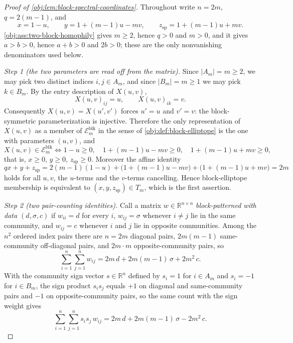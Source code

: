 \documentclass[11pt]{article}
\begin{document}
\begin{proof}[Proof of \cref{obj:lem:block-spectral-coordinates}]
Throughout write \(n=2m\), \(q=2(m-1)\), and
\[
x=1-u,\qquad
y=1+(m-1)u-mv,\qquad
z_{\mathrm{sp}}=1+(m-1)u+mv .
\]
\cref{obj:ass:two-block-homophily} gives \(m\ge2\), hence \(q>0\) and \(m>0\), and it gives \(a>b>0\), hence \(a+b>0\) and \(2b>0\); these are the only nonvanishing denominators used below.

\emph{Step 1 (the two parameters are read off from the matrix).}  Since \(|A_m|=m\ge2\), we may pick two distinct indices \(i,j\in A_m\), and since \(|B_m|=m\ge1\) we may pick \(k\in B_m\).  By the entry description of \(X(u,v)\),
\[
X(u,v)_{ij}=u,
\qquad
X(u,v)_{ik}=v .
\]
Consequently \(X(u,v)=X(u',v')\) forces \(u'=u\) and \(v'=v\): the block-symmetric parameterization is injective.  Therefore the only representation of \(X(u,v)\) as a member of \(\mathcal E_m^{\mathrm{blk}}\) in the sense of \cref{obj:def:block-elliptope} is the one with parameters \((u,v)\), and
\[
X(u,v)\in\mathcal E_m^{\mathrm{blk}}
\iff
1-u\ge0,\quad
1+(m-1)u-mv\ge0,\quad
1+(m-1)u+mv\ge0,
\]
that is, \(x\ge0\), \(y\ge0\), \(z_{\mathrm{sp}}\ge0\).  Moreover the affine identity
\[
qx+y+z_{\mathrm{sp}}
=2(m-1)(1-u)+\bigl(1+(m-1)u-mv\bigr)+\bigl(1+(m-1)u+mv\bigr)
=2m
\]
holds for all \(u,v\), the \(u\)-terms and the \(v\)-terms cancelling.  Hence block-elliptope membership is equivalent to \((x,y,z_{\mathrm{sp}})\in T_m\), which is the first assertion. %

\emph{Step 2 (two pair-counting identities).}  Call a matrix \(w\in\mathbb R^{n\times n}\) \emph{block-patterned with data \((d,\sigma,c)\)} if \(w_{ii}=d\) for every \(i\), \(w_{ij}=\sigma\) whenever \(i\ne j\) lie in the same community, and \(w_{ij}=c\) whenever \(i\) and \(j\) lie in opposite communities.  Among the \(n^2\) ordered index pairs there are \(n=2m\) diagonal pairs, \(2m(m-1)\) same-community off-diagonal pairs, and \(2m\cdot m\) opposite-community pairs, so
\[
\sum_{i=1}^{n}\sum_{j=1}^{n}w_{ij}
=2m\,d+2m(m-1)\,\sigma+2m^2\,c .
\]
With the community sign vector \(s\in\mathbb R^{n}\) defined by \(s_i=1\) for \(i\in A_m\) and \(s_i=-1\) for \(i\in B_m\), the sign product \(s_is_j\) equals \(+1\) on diagonal and same-community pairs and \(-1\) on opposite-community pairs, so the same count with the sign weight gives
\[
\sum_{i=1}^{n}\sum_{j=1}^{n}s_is_j\,w_{ij}
=2m\,d+2m(m-1)\,\sigma-2m^2\,c .
\]


\end{proof}
\end{document}
